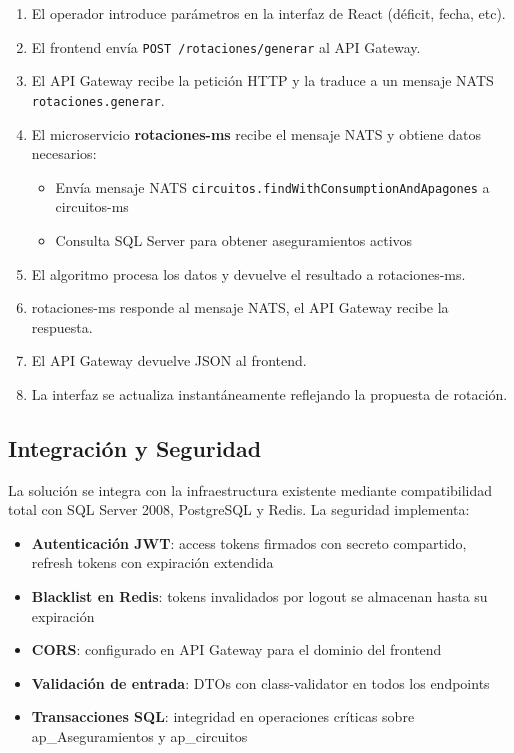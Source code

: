 \begin{enumerate}
    \item El operador introduce parámetros en la interfaz de React (déficit, fecha, etc).
    \item El frontend envía \texttt{POST /rotaciones/generar} al API Gateway.
    \item El API Gateway recibe la petición HTTP y la traduce a un mensaje NATS \texttt{rotaciones.generar}.
    \item El microservicio \textbf{rotaciones-ms} recibe el mensaje NATS y obtiene datos necesarios:
    \begin{itemize}
        \item Envía mensaje NATS \texttt{circuitos.findWithConsumptionAndApagones} a circuitos-ms
        \item Consulta SQL Server para obtener aseguramientos activos
    \end{itemize}
    \item El algoritmo procesa los datos y devuelve el resultado a rotaciones-ms.
    \item rotaciones-ms responde al mensaje NATS, el API Gateway recibe la respuesta.
    \item El API Gateway devuelve JSON al frontend.
    \item La interfaz se actualiza instantáneamente reflejando la propuesta de rotación.
\end{enumerate}

\subsection{Integración y Seguridad}
La solución se integra con la infraestructura existente mediante compatibilidad total con SQL Server 2008, PostgreSQL y Redis. La seguridad implementa:

\begin{itemize}
    \item \textbf{Autenticación JWT}: access tokens firmados con secreto compartido, refresh tokens con expiración extendida
    \item \textbf{Blacklist en Redis}: tokens invalidados por logout se almacenan hasta su expiración
    \item \textbf{CORS}: configurado en API Gateway para el dominio del frontend
    \item \textbf{Validación de entrada}: DTOs con class-validator en todos los endpoints
    \item \textbf{Transacciones SQL}: integridad en operaciones críticas sobre ap\_Aseguramientos y ap\_circuitos
\end{itemize}

